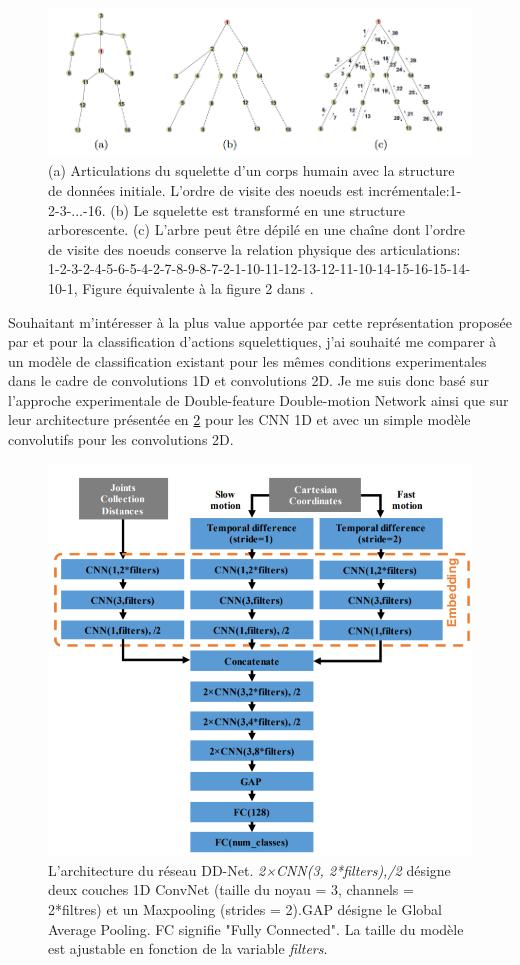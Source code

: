 \begin{figure}[H]
    \centering
    \includegraphics[width=1\linewidth]{Images/DFS.png}
    \caption{(a) Articulations du squelette d'un corps humain avec la structure de données initiale. L'ordre de visite des noeuds est incrémentale:1-2-3-...-16. (b) Le squelette est transformé en une structure arborescente. (c)  L'arbre peut être dépilé en une chaîne dont l'ordre de visite des noeuds conserve la relation physique des articulations: 1-2-3-2-4-5-6-5-4-2-7-8-9-8-7-2-1-10-11-12-13-12-11-10-14-15-16-15-14-10-1, Figure équivalente à la figure 2 dans  \cite{liu2016spatio}.}
    \label{fig:DFS}
\end{figure}

Souhaitant m'intéresser à la plus value apportée par cette représentation proposée par \cite{liu2016spatio} et \cite{2018arXiv180110304Y} pour la classification d'actions squelettiques, j'ai souhaité me comparer à un modèle de classification existant pour les mêmes conditions experimentales dans le cadre de convolutions 1D et convolutions 2D. Je me suis donc basé sur l'approche experimentale de Double-feature Double-motion Network \cite{2019arXiv190709658Y} ainsi que sur leur architecture présentée en \ref{fig:DDnet} pour les CNN 1D et avec un simple modèle convolutifs pour les convolutions 2D.


\begin{figure}[H]
    \centering
    \includegraphics[width=0.55\linewidth]{Images/ddnet.png}
    \caption{L'architecture du réseau DD-Net. \textit{2×CNN(3,
2*filters),/2} désigne deux couches 1D ConvNet (taille du noyau
= 3, channels = 2*filtres) et un Maxpooling (strides = 2).GAP
désigne le Global Average Pooling. FC signifie "Fully Connected". La taille du modèle est ajustable en fonction de la variable \textit{filters}.}
    \label{fig:DDnet}
\end{figure}

